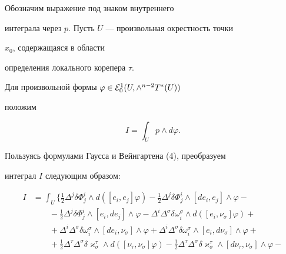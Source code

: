 \begin{pf} Обозначим выражение под знаком внутреннего


интеграла через $p$. Пусть $U$ --- произвольная окрестность точки


$x_0$, содержащаяся в области


определения локального корепера $\tau$.


Для произвольной формы $\varphi\in {\cal E}^1_0(U,\wedge^{n-2}T^*(U))$


положим


\begin{equation}


I=\int_{U}p\wedge d\varphi.


\end{equation}


Пользуясь формулами Гаусса и Вейнгартена (4), преобразуем


интеграл $I$ следующим образом:


\begin{align*}


I&=\int_{U}\biggl\{\frac{1}{2}\Delta^j\delta\Phi^i_j\wedge


d([e_i,e_j]\varphi)-\frac{1}{2}\Delta^j\delta\Phi^i_j\wedge


[de_i,e_j]\wedge\varphi-\\


%


&\qquad-\frac{1}{2}\Delta^j\delta\Phi^i_j\wedge[e_i,de_j]\wedge\varphi-


\Delta^i\Delta^{\sigma}\delta\omega^{\sigma}_i\wedge


d([e_i,\nu_{\sigma}]\varphi)+\\


%


&\qquad+ \Delta^i\Delta^{\sigma}\delta\omega^{\sigma}_i\wedge


[de_i,\nu_{\sigma}]\wedge\varphi+\Delta^i\Delta^{\sigma}


\delta\omega^{\sigma}_i\wedge[e_i,d\nu_{\sigma}]\wedge\varphi+\\


%


&\qquad +\frac{1}{2}\Delta^{\tau}\Delta^{\sigma}\delta\varkappa^{\tau}_{\sigma}


\wedge d([\nu_{\tau},\nu_{\sigma}]\varphi)-


\frac{1}{2}\Delta^{\tau}\Delta^{\sigma}\delta\varkappa^{\tau}_{\sigma}


\wedge[d\nu_{\tau},\nu_{\sigma}]\wedge\varphi-\\



\end{align*}
\end{pf}
